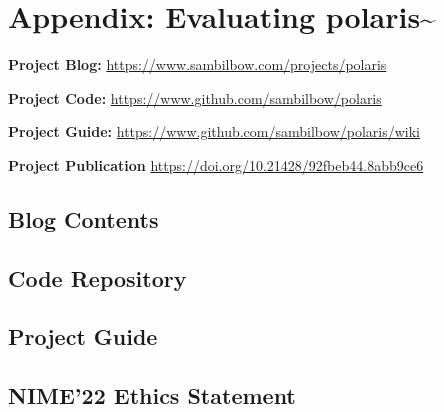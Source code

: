 \chapter{Appendix: Evaluating polaris\textasciitilde{}}

\noindent \textbf{Project Blog:}        \url{https://www.sambilbow.com/projects/polaris}

\noindent \textbf{Project Code:}        \url{https://www.github.com/sambilbow/polaris}

\noindent \textbf{Project Guide:}       \url{https://www.github.com/sambilbow/polaris/wiki}

\noindent \textbf{Project Publication } \url{https://doi.org/10.21428/92fbeb44.8abb9ce6}

\section{Blog Contents}
\section{Code Repository}
\section{Project Guide}
\section{NIME'22 Ethics Statement}






